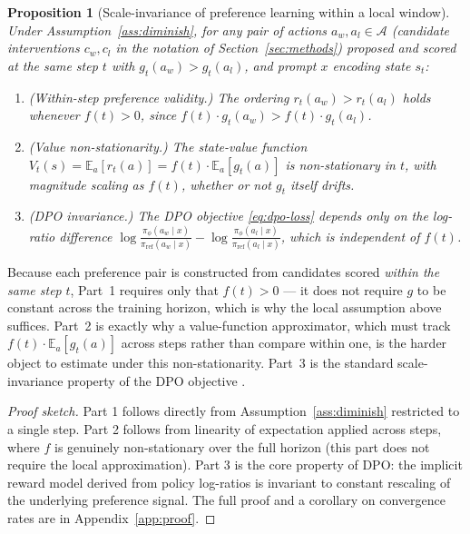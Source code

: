 \documentclass{article}
\theoremstyle{plain}
\newtheorem{proposition}[theorem]{Proposition}
\theoremstyle{definition}
\theoremstyle{remark}
\begin{document}
\begin{proposition}[Scale-invariance of preference learning within a local window]
\label{prop:scale-invariance}
Under Assumption~\ref{ass:diminish}, for any pair of actions $a_w, a_l \in \mathcal{A}$ (candidate interventions $c_w, c_l$ in the notation of Section~\ref{sec:methods}) proposed and scored at the same step $t$ with $g_t(a_w) > g_t(a_l)$, and prompt $x$ encoding state $s_t$:
\begin{enumerate}[leftmargin=1.5em,topsep=0.2em,itemsep=0.1em]
\item \emph{(Within-step preference validity.)} The ordering $r_t(a_w) > r_t(a_l)$ holds whenever $f(t) > 0$, since $f(t) \cdot g_t(a_w) > f(t) \cdot g_t(a_l)$.
\item \emph{(Value non-stationarity.)} The state-value function $V_t(s) = \mathbb{E}_a[r_t(a)] = f(t) \cdot \mathbb{E}_a[g_t(a)]$ is non-stationary in $t$, with magnitude scaling as $f(t)$, whether or not $g_t$ itself drifts.
\item \emph{(DPO invariance.)} The DPO objective \eqref{eq:dpo-loss} depends only on the log-ratio difference $\log\tfrac{\pi_\phi(a_w \mid x)}{\pi_\text{ref}(a_w \mid x)} - \log\tfrac{\pi_\phi(a_l \mid x)}{\pi_\text{ref}(a_l \mid x)}$, which is independent of $f(t)$.
\end{enumerate}
\end{proposition}

Because each preference pair is constructed from candidates scored \emph{within the same step} $t$, Part~1 requires only that $f(t) > 0$ --- it does not require $g$ to be constant across the training horizon, which is why the local assumption above suffices. Part~2 is exactly why a value-function approximator, which must track $f(t)\cdot\mathbb{E}_a[g_t(a)]$ across steps rather than compare within one, is the harder object to estimate under this non-stationarity. Part~3 is the standard scale-invariance property of the DPO objective \citep{rafailov2023direct}.

\begin{proof}[Proof sketch]
Part 1 follows directly from Assumption~\ref{ass:diminish} restricted to a single step. Part 2 follows from linearity of expectation applied across steps, where $f$ is genuinely non-stationary over the full horizon (this part does not require the local approximation). Part 3 is the core property of DPO: the implicit reward model derived from policy log-ratios is invariant to constant rescaling of the underlying preference signal. The full proof and a corollary on convergence rates are in Appendix~\ref{app:proof}.
\end{proof}
\end{document}
